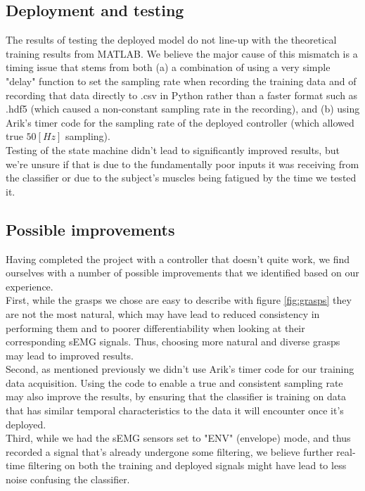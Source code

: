 \documentclass[10pt]{article}
\begin{document}
\subsection{Deployment and testing}
The results of testing the deployed model do not line-up with the theoretical training results from MATLAB. We believe the major cause of this mismatch is a timing issue that stems from both (a) a combination of using a very simple "delay" function to set the sampling rate when recording the training data and of recording that data directly to .csv in Python rather than a faster format such as .hdf5 (which caused a non-constant sampling rate in the recording), and (b) using Arik's timer code for the sampling rate of the deployed controller (which allowed true $50[Hz]$ sampling).\\
Testing of the state machine didn't lead to significantly improved results, but we're unsure if that is due to the fundamentally poor inputs it was receiving from the classifier or due to the subject's muscles being fatigued by the time we tested it.

\subsection{Possible improvements}
Having completed the project with a controller that doesn't quite work, we find ourselves with a number of possible improvements that we identified based on our experience.\\
First, while the grasps we chose are easy to describe with figure \ref{fig:grasps} they are not the most natural, which may have lead to reduced consistency in performing them and to poorer differentiability when looking at their corresponding sEMG signals. Thus, choosing more natural and diverse grasps may lead to improved results.\\
Second, as mentioned previously we didn't use Arik's timer code for our training data acquisition. Using the code to enable a true and consistent sampling rate may also improve the results, by ensuring that the classifier is training on data that has similar temporal characteristics to the data it will encounter once it's deployed.\\
Third, while we had the sEMG sensors set to "ENV" (envelope) mode, and thus recorded a signal that's already undergone some filtering, we believe further real-time filtering on both the training and deployed signals might have lead to less noise confusing the classifier.
\end{document}

